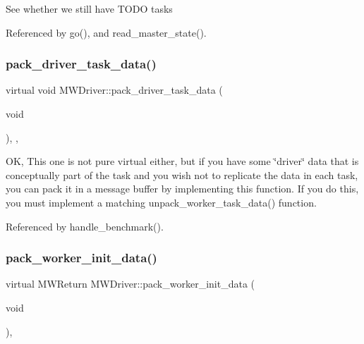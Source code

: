 See whether we still have T\+O\+DO tasks 

Referenced by go(), and read\+\_\+master\+\_\+state().

\mbox{\label{classMWDriver_af6856e6de5bd17575e809e8e24140844}} 
\subsubsection{\texorpdfstring{pack\+\_\+driver\+\_\+task\+\_\+data()}{pack\_driver\_task\_data()}}
{\footnotesize\ttfamily virtual void M\+W\+Driver\+::pack\+\_\+driver\+\_\+task\+\_\+data (\begin{DoxyParamCaption}\item[{void}]{ }\end{DoxyParamCaption})\hspace{0.3cm}{\ttfamily [inline]}, {\ttfamily [protected]}, {\ttfamily [virtual]}}

OK, This one is not pure virtual either, but if you have some \char`\"{}driver\char`\"{} data that is conceptually part of the task and you wish not to replicate the data in each task, you can pack it in a message buffer by implementing this function. If you do this, you must implement a matching unpack\+\_\+worker\+\_\+task\+\_\+data() function. 

Referenced by handle\+\_\+benchmark().

\mbox{\label{classMWDriver_a6a142fda8b58806b1769558afd17c85c}} 
\subsubsection{\texorpdfstring{pack\+\_\+worker\+\_\+init\+\_\+data()}{pack\_worker\_init\_data()}}
{\footnotesize\ttfamily virtual M\+W\+Return M\+W\+Driver\+::pack\+\_\+worker\+\_\+init\+\_\+data (\begin{DoxyParamCaption}\item[{void}]{ }\end{DoxyParamCaption})\hspace{0.3cm}{\ttfamily [protected]}, {}}

